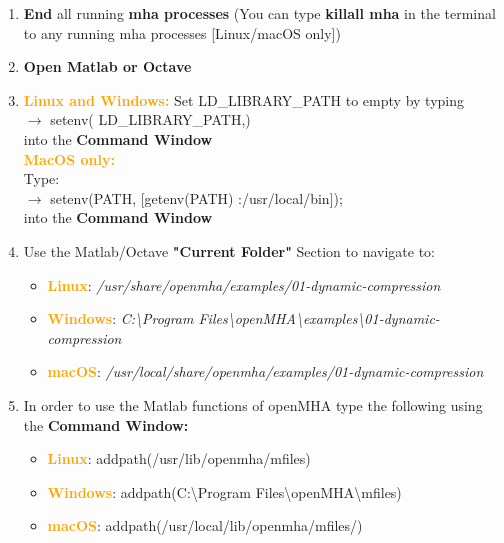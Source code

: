 \documentclass[11pt,a4paper,twoside]{article}
\newcommand{\+}{\discretionary{\mbox{\scriptsize$\hookleftarrow$}}{}{}}
\begin{document}
{{%

\begin{enumerate}
\item \textbf{End} all running \textbf{mha processes} (You can type \textbf{killall mha} in the terminal to any running mha processes [Linux/macOS only])
\item \textbf{Open Matlab or Octave}
\item \textcolor{orange}{\textbf{Linux and Windows:}} Set LD\_LIBRARY\_PATH to empty by typing \\ {\ttfamily
  $\rightarrow$ setenv(\textquotesingle
  LD\_LIBRARY\_PATH\textquotesingle,\textquotesingle\textquotesingle)} \\
  into the \textbf{Command Window} \\
\textcolor{orange}{\textbf{MacOS only:}} \\Type: \\{\ttfamily $\rightarrow$ setenv(\textquotesingle PATH\textquotesingle, [getenv(\textquotesingle PATH\textquotesingle) \textquotesingle :/usr/local/bin\textquotesingle]);} \\
into the \textbf{Command Window} \\  
\item Use the Matlab/Octave \textbf{"Current Folder"} Section to navigate to:

\begin{itemize}
\item \textcolor{orange}{\textbf{Linux}}: \textit{/usr/share/openmha/examples/01-dynamic-compression} 
\item \textcolor{orange}{\textbf{Windows}}: \textit{C:\textbackslash Program Files\textbackslash openMHA\textbackslash examples\textbackslash 01-dynamic-compression}
\item \textcolor{orange}{\textbf{macOS}}: \textit{/usr/local/share/openmha/examples/01-dynamic-compression} 
\end{itemize}

\item In order to use the Matlab functions of openMHA type the following using the \textbf{Command Window:} 

\begin{itemize}
\item \textcolor{orange}{\textbf{Linux}}: {\ttfamily addpath(\textquotesingle{}/usr/lib/openmha/mfiles\textquotesingle{})}
\item \textcolor{orange}{\textbf{Windows}}: {\ttfamily addpath(\textquotesingle{}C:\textbackslash Program Files\textbackslash openMHA\textbackslash mfiles\textquotesingle{})}
\item \textcolor{orange}{\textbf{macOS}}: {\ttfamily addpath(\textquotesingle{}/usr/local/lib/openmha/mfiles/\textquotesingle{})}
\end{itemize}



\end{enumerate}}}
\end{document}

